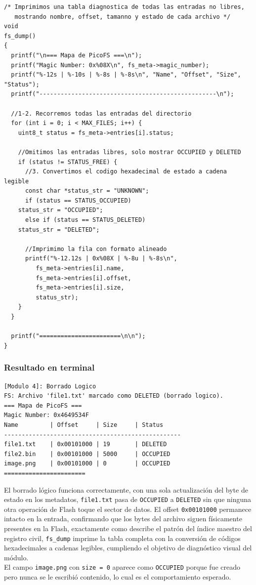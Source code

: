 \documentclass[12pt,letterpaper]{article}
\begin{document}
\begin{lstlisting}[style=modernc, caption={Módulo 4B: volcado diagnóstico de la tabla de directorio}]
/* Imprimimos una tabla diagnostica de todas las entradas no libres,
   mostrando nombre, offset, tamanno y estado de cada archivo */
void
fs_dump()
{
  printf("\n=== Mapa de PicoFS ===\n");
  printf("Magic Number: 0x%08X\n", fs_meta->magic_number);
  printf("%-12s | %-10s | %-8s | %-8s\n", "Name", "Offset", "Size", "Status");
  printf("--------------------------------------------------\n");
  
  //1-2. Recorremos todas las entradas del directorio
  for (int i = 0; i < MAX_FILES; i++) {
    uint8_t status = fs_meta->entries[i].status;
    
    //Omitimos las entradas libres, solo mostrar OCCUPIED y DELETED
    if (status != STATUS_FREE) {
      //3. Convertimos el codigo hexadecimal de estado a cadena legible
      const char *status_str = "UNKNOWN";
      if (status == STATUS_OCCUPIED)
	status_str = "OCCUPIED";
      else if (status == STATUS_DELETED)
	status_str = "DELETED";
      
      //Imprimimo la fila con formato alineado
      printf("%-12.12s | 0x%08X | %-8u | %-8s\n",
	     fs_meta->entries[i].name,
	     fs_meta->entries[i].offset,
	     fs_meta->entries[i].size,
	     status_str);
    }
  }
  
  printf("=======================\n\n");
}
\end{lstlisting}

\bigskip

\subsubsection*{Resultado en terminal}

\begin{Verbatim}[frame=single, fontsize=\footnotesize]
[Modulo 4]: Borrado Logico
FS: Archivo 'file1.txt' marcado como DELETED (borrado logico).
=== Mapa de PicoFS ===
Magic Number: 0x4649534F
Name         | Offset     | Size     | Status
--------------------------------------------------
file1.txt    | 0x00101000 | 19       | DELETED
file2.bin    | 0x00101000 | 5000     | OCCUPIED
image.png    | 0x00101000 | 0        | OCCUPIED
=======================
\end{Verbatim}

El borrado lógico funciona correctamente, con una sola actualización del byte de estado en los metadatos,
\texttt{file1.txt} pasa de \texttt{OCCUPIED} a \texttt{DELETED} sin que ninguna otra operación de Flash toque el
sector de datos. El offset \texttt{0x00101000} permanece intacto en la entrada, confirmando que los bytes del
archivo siguen físicamente presentes en la Flash, exactamente como describe el patrón del índice maestro del
registro civil, \texttt{fs\_dump} imprime la tabla completa con la conversión de códigos hexadecimales a cadenas
legibles, cumpliendo el objetivo de diagnóstico visual del módulo.\\
El campo \texttt{image.png} con \texttt{size = 0} aparece como \texttt{OCCUPIED} porque fue creado pero nunca se
le escribió contenido, lo cual es el comportamiento esperado.
\end{document}
